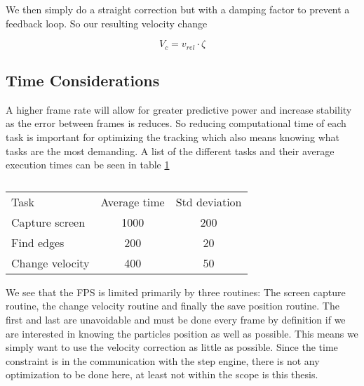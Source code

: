We then simply do a straight correction but with a damping factor to prevent a feedback loop. So our resulting velocity change 

\begin{equation}
V_c = v_{rel}\cdot \zeta
\end{equation}

\subsection{Time Considerations}\label{sec:time considerations}
A higher frame rate will allow for greater predictive power and increase stability as the error between frames is reduces. So reducing computational time of each task is important for optimizing the tracking which also means knowing what tasks are the most demanding. A list of the different tasks and their average execution times can be seen in table \ref{tab:benchmarks}

\begin{table}[H]
 \begin{tabular}{l | c | c } 
 Task  			&  Average time & Std deviation \\
 Capture screen & 1000 			& 200 \\
 Find edges 	& 200			& 20 \\
 Change velocity& 400			& 50 \\
 \end{tabular}
 \caption{}
 \label{tab:benchmarks}
\end{table}

We see that the FPS is limited primarily by three routines: The screen capture routine, the change velocity routine and finally the save position routine. The first and last are unavoidable and must be done every frame by definition if we are interested in knowing the particles position as well as possible. This means we simply want to use the velocity correction as little as possible. Since the time constraint is in the communication with the step engine, there is not any optimization to be done here, at least not within the scope is this thesis. 
